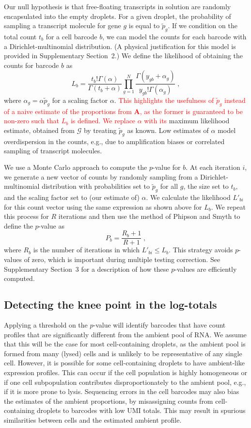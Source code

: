\documentclass[10pt,letterpaper]{article}
\newcommand{\revised}[1]{\textcolor{red}{#1}}
\newcommand{\suppsecphysical}{2}
\newcommand{\suppsecmontecarlo}{3}
\begin{document}
Our null hypothesis is that free-floating transcripts in solution are randomly encapsulated into the empty droplets.
For a given droplet, the probability of sampling a transcript molecule for gene $g$ is equal to $\tilde{p}_g$.
If we condition on the total count $t_b$ for a cell barcode $b$, we can model the counts for each barcode with a Dirichlet-multinomial distribution.
(A physical justification for this model is provided in Supplementary Section~\suppsecphysical{}.)
We define the likelihood of obtaining the counts for barcode $b$ as 
\[
    L_b = \frac{t_b!\Gamma(\alpha)}{\Gamma(t_b + \alpha)} \prod_{g=1}^N \frac{\Gamma(y_{gb}+\alpha_g)}{y_{gb}!\Gamma(\alpha_g)} \;,
\]
where $\alpha_g = \alpha\tilde{p}_g$ for a scaling factor $\alpha$.
\revised{This highlights the usefulness of $\tilde p_g$ instead of a naive estimate of the proportions from $\mathbf{A}$, as the former is guaranteed to be non-zero such that $L_b$ is defined.}
\revised{We replace $\alpha$ with its} maximum likelihood estimate, obtained from $\mathcal{G}$ by treating $\tilde{p}_g$ as known.
Low estimates of $\alpha$ model overdispersion in the counts, e.g., due to amplification biases or correlated sampling of transcript molecules.

We use a Monte Carlo approach to compute the $p$-value for $b$.
At each iteration $i$, we generate a new vector of counts by randomly sampling from a Dirichlet-multinomial distribution with probabilities set to $\tilde{p}_g$ for all $g$, the size set to $t_b$, and the scaling factor set to (our estimate of) $\alpha$.
We calculate the likelihood $L'_{bi}$ for this count vector using the same expression as shown above for $L_b$.
We repeat this process for $R$ iterations and then use the method of Phipson and Smyth \cite{phipson2010permutation} to define the $p$-value as 
\[
    P_b = \frac{R_b +1 }{R + 1} \;,
\]
where $R_b$ is the number of iterations in which $L'_{bi} \le L_b$.
This strategy avoids $p$-values of zero, which is important during multiple testing correction.
See Supplementary Section~\suppsecmontecarlo{} for a description of how these $p$-values are efficiently computed.

\subsection*{Detecting the knee point in the log-totals}
Applying a threshold on the $p$-value will identify barcodes that have count profiles that are significantly different from the ambient pool of RNA.
We assume that this will be the case for most cell-containing droplets, as the ambient pool is formed from many (lysed) cells and is unlikely to be representative of any single cell.
However, it is possible for some cell-containing droplets to have ambient-like expression profiles.
This can occur if the cell population is highly homogeneous or if one cell subpopulation contributes disproportionately to the ambient pool, e.g., if it is more prone to lysis.
Sequencing errors in the cell barcodes may also bias the estimates of the ambient proportions, by misassigning counts from cell-containing droplets to barcodes with low UMI totals.
This may result in spurious similarities between cells and the estimated ambient profile.
\end{document}
